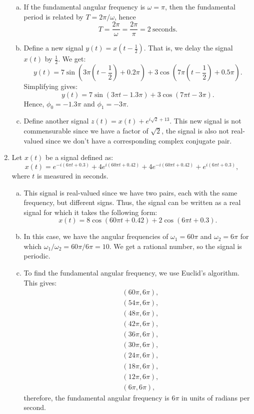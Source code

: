 \begin{enumerate}
\begin{enumerate}[a)]
\item If the fundamental angular frequency is $\omega=\pi$, then the fundamental period is related by $T=2\pi/\omega$, hence
$$T=\frac{2\pi}{\omega}=\frac{2\pi}{\pi}=2\ \text{seconds}.$$

\item Define a new signal $y(t)=x(t-\frac{1}{2})$. That is, we delay the signal $x(t)$ by $\frac{1}{2}$. We get:
$$y(t)=7\sin(3\pi \left(t-\frac{1}{2}\right)+0.2\pi)+3\cos(7\pi \left(t-\frac{1}{2}\right)+0.5\pi).$$
Simplifying gives:
$$y(t)=7\sin(3\pi t-1.3\pi)+3\cos(7\pi t-3\pi).$$
Hence, $\phi_{0}=-1.3\pi$ and $\phi_{1}=-3\pi$. 

\item Define another signal $z(t)=x(t)+e^{i\sqrt{2}+13}$. This new signal is not commensurable since we have a factor of $\sqrt{2}$, the signal is also not real-valued since we don't have a corresponding complex conjugate pair. 
\end{enumerate}

\item Let $x(t)$ be a signal defined as:
$$x(t)=e^{-i(6\pi t+0.3)}+4e^{i(60\pi t+0.42)}+4e^{-i(60\pi t+0.42)}+e^{i(6\pi t+0.3)},$$
where $t$ is measured in seconds. 
\begin{enumerate}[a)]
\item This signal is real-valued since we have two pairs, each with the same frequency, but different signs. Thus, the signal can be written as a real signal for which it takes the following form:
$$x(t)=8\cos(60\pi t+0.42)+2\cos(6\pi t+0.3).$$
\item In this case, we have the angular frequencies of $\omega_{1}=60\pi$ and $\omega_{2}=6\pi$ for which $\omega_{1}/\omega_{2}=60\pi/6\pi=10$. We get a rational number, so the signal is periodic. 
\item To find the fundamental angular frequency, we use Euclid's algorithm. This gives:
\begin{align*}
    &(60\pi,6\pi), \\
    &(54\pi,6\pi), \\
    &(48\pi,6\pi), \\
    &(42\pi,6\pi), \\
    &(36\pi,6\pi), \\
    &(30\pi,6\pi), \\
    &(24\pi,6\pi), \\
    &(18\pi,6\pi), \\
    &(12\pi,6\pi), \\
    &(6\pi,6\pi), 
\end{align*}
therefore, the fundamental angular frequency is $6\pi$ in units of radians per second. 


\end{enumerate}
\end{enumerate}
